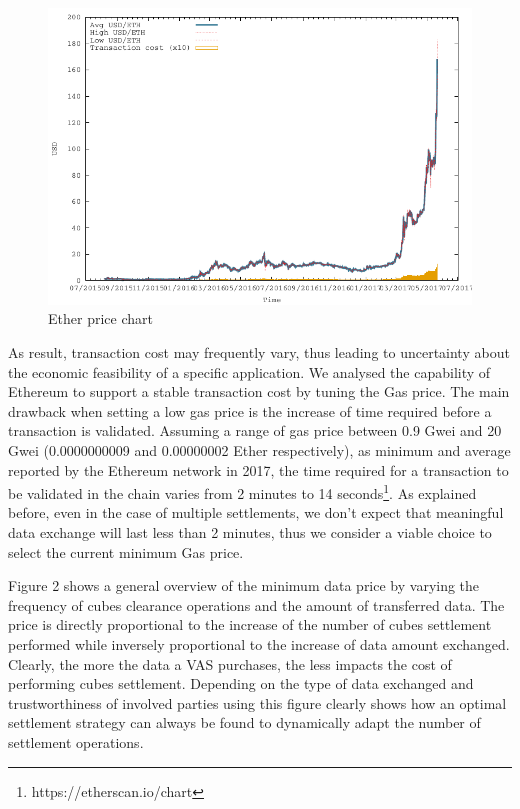 \documentclass[chi_draft]{sigchi}
\begin{document}
\begin{figure}
	\centering
	\includegraphics[width=\columnwidth]{figures/price}
	\caption{Ether price chart}
\label{fig:EthPrice}
\end{figure}

As result, transaction cost may frequently vary, thus leading to uncertainty about the economic feasibility of a specific application. We analysed the capability of Ethereum to support a stable transaction cost by tuning the Gas price. The main drawback when setting a low gas price is the increase of time required before a transaction is validated. Assuming a range of gas price between 0.9 Gwei and 20 Gwei (0.0000000009 and 0.00000002 Ether respectively), as minimum and average reported by the Ethereum network in 2017, the time required for a transaction to be validated in the chain varies from 2 minutes to 14 seconds\footnote{https://etherscan.io/chart}. As explained before, even in the case of multiple settlements, we don’t expect that meaningful data exchange will last less than 2 minutes, thus we consider a viable choice to select the current minimum Gas price.


Figure 2 shows a general overview of the minimum data price by varying the frequency of cubes clearance operations and the amount of transferred data. The price is directly proportional to the increase of the number of cubes settlement performed while inversely proportional to the increase of data amount exchanged. Clearly, the more the data a VAS purchases, the less impacts the cost of performing cubes settlement. Depending on the type of data exchanged and trustworthiness of involved parties using this figure clearly shows how an optimal settlement strategy can always be found to dynamically adapt the number of settlement operations.
\end{document}
